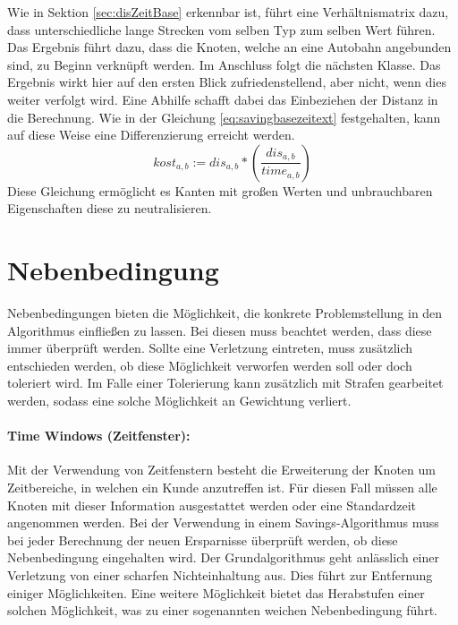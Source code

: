 \noindent
Wie in Sektion \ref{sec:disZeitBase} erkennbar ist, führt eine Verhältnismatrix dazu, dass unterschiedliche lange Strecken vom selben Typ zum selben Wert führen. 
Das Ergebnis führt dazu, dass die Knoten, welche an eine Autobahn angebunden sind, zu Beginn verknüpft werden. 
Im Anschluss folgt die nächsten Klasse. 
Das Ergebnis wirkt hier auf den ersten Blick zufriedenstellend, aber nicht, wenn dies weiter verfolgt wird. 
Eine Abhilfe schafft dabei das Einbeziehen der Distanz in die Berechnung. 
Wie in der Gleichung \ref{eq:savingbasezeitext} festgehalten, kann auf diese Weise eine Differenzierung erreicht werden. 
\begin{equation}
kost_{a,b} := dis_{a,b} * (\frac{dis_{a,b}}{time_{a,b}})
\label{eq:savingbasezeitext}
\end{equation}
Diese Gleichung ermöglicht es Kanten mit großen Werten und unbrauchbaren Eigenschaften diese zu neutralisieren. 

\section{Nebenbedingung}

Nebenbedingungen bieten die Möglichkeit, die konkrete Problemstellung in den Algorithmus einfließen zu lassen. 
Bei diesen muss beachtet werden, dass diese immer überprüft werden. 
Sollte eine Verletzung eintreten, muss zusätzlich entschieden werden, ob diese Möglichkeit verworfen werden soll oder doch toleriert wird. 
Im Falle einer Tolerierung kann zusätzlich mit Strafen gearbeitet werden, sodass eine solche Möglichkeit an Gewichtung verliert. 

\paragraph{Time Windows (Zeitfenster):} 

Mit der Verwendung von Zeitfenstern besteht die Erweiterung der Knoten um Zeitbereiche, in welchen ein Kunde anzutreffen ist. 
Für diesen Fall müssen alle Knoten mit dieser Information ausgestattet werden oder eine Standardzeit angenommen werden. 
Bei der Verwendung in einem Savings-Algorithmus muss bei jeder Berechnung der neuen Ersparnisse überprüft werden, ob diese Nebenbedingung eingehalten wird. 
Der Grundalgorithmus geht anlässlich einer Verletzung von einer scharfen Nichteinhaltung aus. 
Dies führt zur Entfernung einiger Möglichkeiten. 
Eine weitere Möglichkeit bietet das Herabstufen einer solchen Möglichkeit, was zu einer sogenannten weichen Nebenbedingung führt. 

